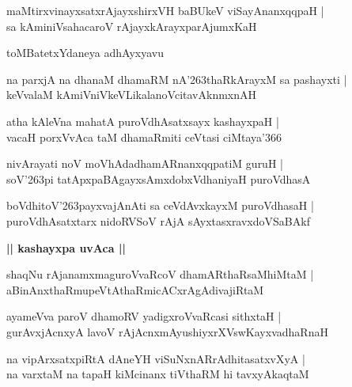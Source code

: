 \documentclass[twoside,12pt,openright]{book}
\def\S{\char'263}
\newcounter{shloka}[chapter]
\def\uvaca#1{\centerline{{\large\textbf{#1}}}}
\begin{document}
\begin{shloka}%
maMtirxvinayxsatxrAjayxshirxVH baBUkeV viSayAnanxqqpaH |\\
sa kAminiVsahacaroV rAjayxkArayxparAjumxKaH
\end{shloka}

\begin{center}
toMBatetxYdaneya adhAyxyavu
\end{center}

\begin{shloka}%
na parxjA na dhanaM dhamaRM nA\S thaRkArayxM sa pashayxti |\\
keVvalaM kAmiVniVkeVLikalanoVcitavAknmxnAH 
\end{shloka}

\begin{shloka}%
atha kAleVna mahatA puroVdhAsatxsayx kashayxpaH |\\
vacaH porxVvAca taM dhamaRmiti ceVtasi ciMtaya\char'366
\end{shloka}

\begin{shloka}%
nivArayati noV moVhAdadhamARnanxqqpatiM guruH |\\
soV\S pi tatApxpaBAgayxsAmxdobxVdhaniyaH puroVdhasA 
\end{shloka}

\begin{shloka}%
boVdhitoV\S payxvajAnAti sa ceVdAvxkayxM puroVdhasaH |\\
puroVdhAsatxtarx nidoRVSoV rAjA sAyxtasxravxdoVSaBAkf
\end{shloka}

\uvaca{|| kashayxpa uvAca ||}

\begin{shloka}%
shaqNu rAjanamxmaguroVvaRcoV dhamARthaRsaMhiMtaM |\\
aBinAnxthaRmupeVtAthaRmicACxrAgAdivajiRtaM
\end{shloka}

\begin{shloka}%
ayameVva paroV dhamoRV yadigxroVvaRcasi sithxtaH |\\
gurAvxjAcnxyA lavoV rAjAcnxmAyushiyxrXVswKayxvadhaRnaH 
\end{shloka}

\begin{shloka}%
na vipArxsatxpiRtA dAneYH viSuNxnARrAdhitasatxvXyA |\\
na varxtaM na tapaH kiMcinanx tiVthaRM hi tavxyAkaqtaM 
\end{shloka}
\end{document}
